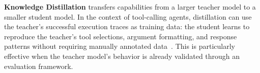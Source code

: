 \textbf{Knowledge Distillation} transfers capabilities from a larger teacher model to a smaller student model. In the context of tool-calling agents, distillation can use the teacher's successful execution traces as training data: the student learns to reproduce the teacher's tool selections, argument formatting, and response patterns without requiring manually annotated data~\cite{hinton2015distilling}. This is particularly effective when the teacher model's behavior is already validated through an evaluation framework.